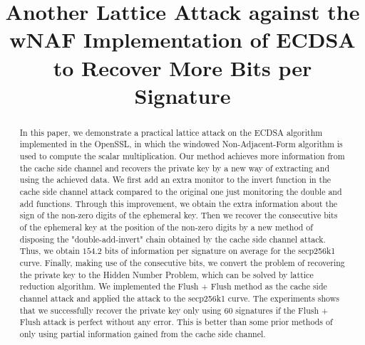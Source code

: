 \documentclass[runningheads]{llncs}
\begin{document}
%
\title{Another Lattice Attack against the wNAF Implementation of ECDSA to Recover More Bits per Signature}
%
%
\maketitle              %
%
\begin{abstract}
In this paper, we demonstrate a practical lattice attack on the ECDSA algorithm implemented in the OpenSSL, in which the windowed Non-Adjacent-Form algorithm is used to compute the scalar multiplication.
Our method achieves more information from the cache side channel and recovers the private key by a new way of extracting and using the achieved data.
We first add an extra monitor to the invert function in the cache side channel attack compared to the original one just monitoring the double and add functions.
 Through this improvement, we obtain the extra information about the sign of the non-zero digits of the ephemeral key.
Then we recover the consecutive bits of the ephemeral key at the position of the non-zero digits by a new method of disposing the "double-add-invert" chain obtained by the cache side channel attack.
Thus, we obtain $154.2$ bits of information per signature on average for the secp256k1 curve.
Finally, making use of the consecutive bits,
 we convert the problem of recovering the private key to the Hidden Number Problem,
 which can be solved by lattice reduction algorithm.
We implemented the Flush + Flush method as the cache side channel attack and applied the attack to the secp256k1 curve.
The experiments shows that we successfully recover the private key only using $60$ signatures if the Flush + Flush attack is perfect without any error.
This is better than some prior methods of only using partial information gained from the cache side channel.

\end{abstract}
%
%
%
\end{document}

